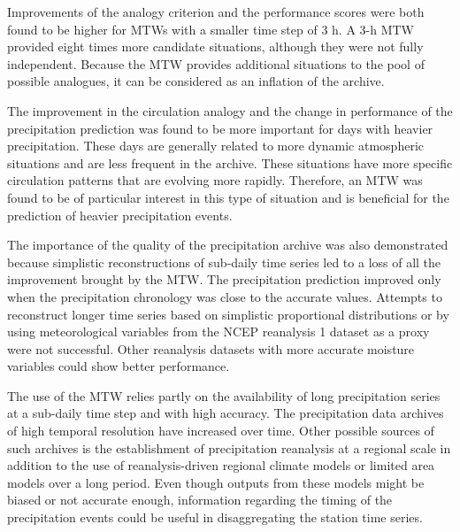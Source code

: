 \documentclass[hess, manuscript]{copernicus}
\begin{document}
	Improvements of the analogy criterion and the performance scores were both found to be higher for MTWs with a smaller time step of 3 h. A 3-h MTW provided eight times more candidate situations, although they were not fully independent. Because the MTW provides additional situations to the pool of possible analogues, it can be considered as an inflation of the archive. 
	
	The improvement in the circulation analogy and the change in performance of the precipitation prediction was found to be more important for days with heavier precipitation. These days are generally related to more dynamic atmospheric situations and are less frequent in the archive. These situations have more specific circulation patterns that are evolving more rapidly. Therefore, an MTW was found to be of particular interest in this type of situation and is beneficial for the prediction of heavier precipitation events.
	
	The importance of the quality of the precipitation archive was also demonstrated because simplistic reconstructions of sub-daily time series led to a loss of all the improvement brought by the MTW. The precipitation prediction improved only when the precipitation chronology was close to the accurate values. Attempts to reconstruct longer time series based on simplistic proportional distributions or by using meteorological variables from the NCEP reanalysis 1 dataset as a proxy were not successful. Other reanalysis datasets with more accurate moisture variables could show better performance.
	
	The use of the MTW relies partly on the availability of long precipitation series at a sub-daily time step and with high accuracy. The precipitation data archives of high temporal resolution have increased over time. Other possible sources of such archives is the establishment of precipitation reanalysis at a regional scale in addition to the use of reanalysis-driven regional climate models or limited area models over a long period. Even though outputs from these models might be biased or not accurate enough, information regarding the timing of the precipitation events could be useful in disaggregating the station time series.
	
\end{document}
